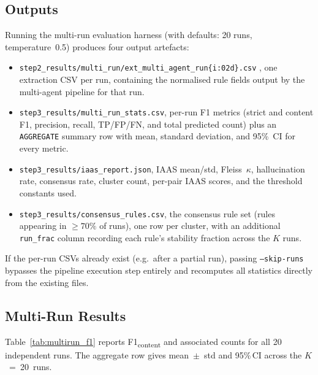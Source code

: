 ﻿\documentclass[11pt]{article}
\begin{document}
\subsection{Outputs}
\label{sec:multirun_outputs}

Running the multi-run evaluation harness (with defaults: 20 runs,
temperature~0.5) produces four output artefacts:
\begin{itemize}
    \item \texttt{step2\_results/multi\_run/ext\_multi\_agent\_run\{i:02d\}.csv}
           , one extraction CSV per run, containing the normalised rule fields
            output by the multi-agent pipeline for that run.
    \item \texttt{step3\_results/multi\_run\_stats.csv}, per-run F1 metrics
          (strict and content F1, precision, recall, TP/FP/FN, and total predicted
          count) plus an \texttt{AGGREGATE} summary row with mean, standard
          deviation, and 95\%~CI for every metric.
    \item \texttt{step3\_results/iaas\_report.json}, IAAS mean/std, Fleiss~$\kappa$,
          hallucination rate, consensus rate, cluster count, per-pair IAAS scores,
          and the threshold constants used.
    \item \texttt{step3\_results/consensus\_rules.csv}, the consensus rule set
          (rules appearing in $\geq 70\%$ of runs), one row per cluster, with
          an additional \texttt{run\_frac} column recording each rule's stability
          fraction across the $K$ runs.
\end{itemize}
If the per-run CSVs already exist (e.g.\ after a partial run), passing
\texttt{--skip-runs} bypasses the pipeline execution step entirely and
recomputes all statistics directly from the existing files.

\subsection{Multi-Run Results}
\label{sec:multirun_results}

Table~\ref{tab:multirun_f1} reports F1\textsubscript{content} and associated
counts for all 20 independent runs.
The aggregate row gives mean~$\pm$~std and 95\%\,CI across the $K$~=~20~runs.
\end{document}
